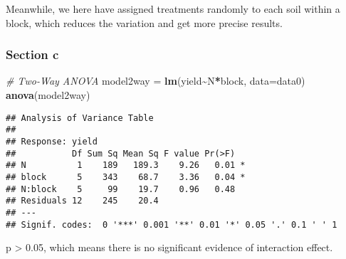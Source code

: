 \documentclass[
]{article}
\newenvironment{Shaded}{\begin{snugshade}}{\end{snugshade}}
\newcommand{\AttributeTok}[1]{\textcolor[rgb]{0.13,0.29,0.53}{#1}}
\newcommand{\CommentTok}[1]{\textcolor[rgb]{0.56,0.35,0.01}{\textit{#1}}}
\newcommand{\FunctionTok}[1]{\textcolor[rgb]{0.13,0.29,0.53}{\textbf{#1}}}
\newcommand{\NormalTok}[1]{#1}
\newcommand{\OtherTok}[1]{\textcolor[rgb]{0.56,0.35,0.01}{#1}}
\newcommand{\SpecialCharTok}[1]{\textcolor[rgb]{0.81,0.36,0.00}{\textbf{#1}}}
\begin{document}
Meanwhile, we here have assigned treatments randomly to each soil within
a block, which reduces the variation and get more precise results.

\subsubsection{Section c}\label{section-c-1}

\begin{Shaded}
\end{Shaded}

\begin{Shaded}
\begin{Highlighting}[]
\CommentTok{\# Two{-}Way ANOVA}
\NormalTok{model2way }\OtherTok{=} \FunctionTok{lm}\NormalTok{(yield}\SpecialCharTok{\textasciitilde{}}\NormalTok{N}\SpecialCharTok{*}\NormalTok{block, }\AttributeTok{data=}\NormalTok{data0)}
\FunctionTok{anova}\NormalTok{(model2way)}
\end{Highlighting}
\end{Shaded}

\begin{verbatim}
## Analysis of Variance Table
## 
## Response: yield
##           Df Sum Sq Mean Sq F value Pr(>F)  
## N          1    189   189.3    9.26   0.01 *
## block      5    343    68.7    3.36   0.04 *
## N:block    5     99    19.7    0.96   0.48  
## Residuals 12    245    20.4                 
## ---
## Signif. codes:  0 '***' 0.001 '**' 0.01 '*' 0.05 '.' 0.1 ' ' 1
\end{verbatim}

p \textgreater{} 0.05, which means there is no significant evidence of
interaction effect.

\begin{Shaded}
\end{Shaded}
\end{document}
